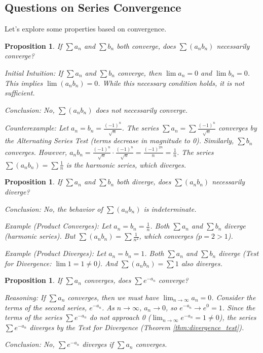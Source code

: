 \documentclass[11pt]{article}
\newtheorem{proposition}[theorem]{Proposition}
\theoremstyle{definition}
\theoremstyle{remark}
\begin{document}
\subsection{Questions on Series Convergence}

Let's explore some properties based on convergence.

\begin{proposition}
If $\sum a_n$ and $\sum b_n$ both converge, does $\sum (a_n b_n)$ necessarily converge?

\textit{Initial Intuition:} If $\sum a_n$ and $\sum b_n$ converge, then $\lim a_n = 0$ and $\lim b_n = 0$. This implies $\lim (a_n b_n) = 0$. While this necessary condition holds, it is not sufficient.

\textit{Conclusion:} No, $\sum (a_n b_n)$ does not necessarily converge.

\textit{Counterexample:} Let $a_n = b_n = \frac{(-1)^n}{\sqrt{n}}$.
The series $\sum a_n = \sum \frac{(-1)^n}{\sqrt{n}}$ converges by the Alternating Series Test (terms decrease in magnitude to 0).
Similarly, $\sum b_n$ converges.
However, $a_n b_n = \frac{(-1)^n}{\sqrt{n}} \cdot \frac{(-1)^n}{\sqrt{n}} = \frac{(-1)^{2n}}{n} = \frac{1}{n}$.
The series $\sum (a_n b_n) = \sum \frac{1}{n}$ is the harmonic series, which diverges.
\end{proposition}

\begin{proposition}
If $\sum a_n$ and $\sum b_n$ both diverge, does $\sum (a_n b_n)$ necessarily diverge?

\textit{Conclusion:} No, the behavior of $\sum (a_n b_n)$ is indeterminate.

\textit{Example (Product Converges):} Let $a_n = b_n = \frac{1}{n}$. Both $\sum a_n$ and $\sum b_n$ diverge (harmonic series). But $\sum (a_n b_n) = \sum \frac{1}{n^2}$, which converges ($p=2>1$).

\textit{Example (Product Diverges):} Let $a_n = b_n = 1$. Both $\sum a_n$ and $\sum b_n$ diverge (Test for Divergence: $\lim 1 = 1 \neq 0$). And $\sum (a_n b_n) = \sum 1$ also diverges.
\end{proposition}

\begin{proposition} \label{prop:exp_an}
If $\sum a_n$ converges, does $\sum e^{-a_n}$ converge?

\textit{Reasoning:}
If $\sum a_n$ converges, then we must have $\lim_{n\to\infty} a_n = 0$.
Consider the terms of the second series, $e^{-a_n}$.
As $n \to \infty$, $a_n \to 0$, so $e^{-a_n} \to e^0 = 1$.
Since the terms of the series $\sum e^{-a_n}$ do not approach 0 ($\lim_{n\to\infty} e^{-a_n} = 1 \neq 0$), the series $\sum e^{-a_n}$ diverges by the Test for Divergence (Theorem \ref{thm:divergence_test}).

\textit{Conclusion:} No, $\sum e^{-a_n}$ diverges if $\sum a_n$ converges.
\end{proposition}
\end{document}
